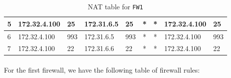 \documentclass[a4paper, 11pt, oneside]{article}
\begin{document}
\begin{table}[H]
{\begin{tabular}{|l|lccl|clcl|}
5                                 & \multicolumn{1}{l|}{172.32.4.100}                                                 & \multicolumn{1}{l|}{25}                                                             & \multicolumn{1}{l|}{172.31.6.5}                                                        & 25                                                                                       & \multicolumn{1}{c|}{*}                                                            & \multicolumn{1}{c|}{*}                                                              & \multicolumn{1}{l|}{172.32.4.100}                                                      & 25                                                                                       \\ \hline
6                                 & \multicolumn{1}{l|}{172.32.4.100}                                                 & \multicolumn{1}{l|}{993}                                                            & \multicolumn{1}{l|}{172.31.6.5}                                                        & 993                                                                                      & \multicolumn{1}{c|}{*}                                                            & \multicolumn{1}{c|}{*}                                                              & \multicolumn{1}{l|}{172.32.4.100}                                                      & 993                                                                                      \\ \hline
7                                 & \multicolumn{1}{l|}{172.32.4.100}                                                 & \multicolumn{1}{l|}{22}                                                             & \multicolumn{1}{l|}{172.31.6.6}                                                        & 22                                                                                       & \multicolumn{1}{c|}{*}                                                            & \multicolumn{1}{c|}{*}                                                              & \multicolumn{1}{l|}{172.32.4.100}                                                      & 22                                                                                       \\ \hline
\end{tabular}
}
\caption{NAT table for \texttt{FW1}}
\end{table}

\paragraph{}For the first firewall, we have the following table of firewall rules:
\end{document}
